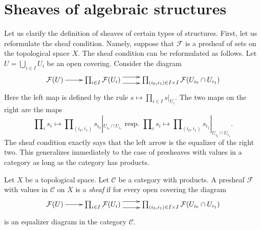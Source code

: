 \section{Sheaves of algebraic structures}
\label{section-sheaves-structures}

\noindent
Let us clarify the definition of sheaves of certain types of structures.
First, let us reformulate the sheaf condition. Namely, suppose that
$\mathcal{F}$ is a presheaf of sets on the topological space $X$.
The sheaf condition can be reformulated as follows. Let
$U = \bigcup_{i\in I} U_i$ be an open covering. Consider the
diagram
$$
\xymatrix{
\mathcal{F}(U) \ar[r]
&
\prod\nolimits_{i\in I}
\mathcal{F}(U_i)
\ar@<1ex>[r] \ar@<-1ex>[r]
&
\prod\nolimits_{(i_0, i_1) \in I\times I}
\mathcal{F}(U_{i_0} \cap U_{i_1})
}
$$
Here the left map is defined by the rule
$s \mapsto \prod_{i \in I} s|_{U_i}$. The two maps
on the right are the maps
$$
\prod\nolimits_i s_i
\mapsto
\prod\nolimits_{(i_0, i_1)} s_{i_0}|_{U_{i_0} \cap U_{i_1}}
\text{ resp. }
\prod\nolimits_i s_i
\mapsto
\prod\nolimits_{(i_0, i_1)} s_{i_1}|_{U_{i_0} \cap U_{i_1}}.
$$
The sheaf condition exactly says that the left arrow
is the equalizer of the right two. This generalizes
immediately to the case of presheaves with values in a
category as long as the category has products.

\begin{definition}
\label{definition-sheaf-values-in-category}
Let $X$ be a topological space. Let $\mathcal{C}$ be
a category with products. A presheaf $\mathcal{F}$ with
values in $\mathcal{C}$ on $X$ is a {\it sheaf} 
if for every open covering the diagram
$$
\xymatrix{
\mathcal{F}(U) \ar[r]
&
\prod\nolimits_{i\in I}
\mathcal{F}(U_i)
\ar@<1ex>[r] \ar@<-1ex>[r]
&
\prod\nolimits_{(i_0, i_1) \in I\times I}
\mathcal{F}(U_{i_0} \cap U_{i_1})
}
$$
is an equalizer diagram in the category $\mathcal{C}$.
\end{definition}

